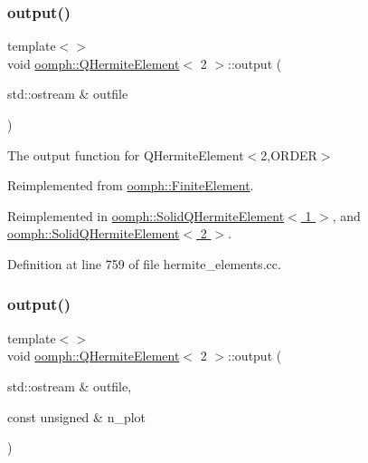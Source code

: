 \mbox{\label{classoomph_1_1QHermiteElement_ad324f863cc0ff28f4c1a6688e606a0bd}} 
\subsubsection{\texorpdfstring{output()}{output()}\hspace{0.1cm}{\footnotesize\ttfamily [9/12]}}
{\footnotesize\ttfamily template$<$$>$ \\
void \hyperlink{classoomph_1_1QHermiteElement}{oomph\+::\+Q\+Hermite\+Element}$<$ 2 $>$\+::output (\begin{DoxyParamCaption}\item[{std\+::ostream \&}]{outfile }\end{DoxyParamCaption})\hspace{0.3cm}{\ttfamily [virtual]}}



The output function for Q\+Hermite\+Element$<$2,\+O\+R\+D\+E\+R$>$ 



Reimplemented from \hyperlink{classoomph_1_1FiniteElement_a2ad98a3d2ef4999f1bef62c0ff13f2a7}{oomph\+::\+Finite\+Element}.



Reimplemented in \hyperlink{classoomph_1_1SolidQHermiteElement_a6459f239b585ae575d779f58f70bae46}{oomph\+::\+Solid\+Q\+Hermite\+Element$<$ 1 $>$}, and \hyperlink{classoomph_1_1SolidQHermiteElement_a6459f239b585ae575d779f58f70bae46}{oomph\+::\+Solid\+Q\+Hermite\+Element$<$ 2 $>$}.



Definition at line 759 of file hermite\+\_\+elements.\+cc.

\mbox{\label{classoomph_1_1QHermiteElement_a056485ca6e8d810dc64f871fc84dbde6}} 
\subsubsection{\texorpdfstring{output()}{output()}\hspace{0.1cm}{\footnotesize\ttfamily [10/12]}}
{\footnotesize\ttfamily template$<$$>$ \\
void \hyperlink{classoomph_1_1QHermiteElement}{oomph\+::\+Q\+Hermite\+Element}$<$ 2 $>$\+::output (\begin{DoxyParamCaption}\item[{std\+::ostream \&}]{outfile,  }\item[{const unsigned \&}]{n\+\_\+plot }\end{DoxyParamCaption})\hspace{0.3cm}{\ttfamily [virtual]}}



